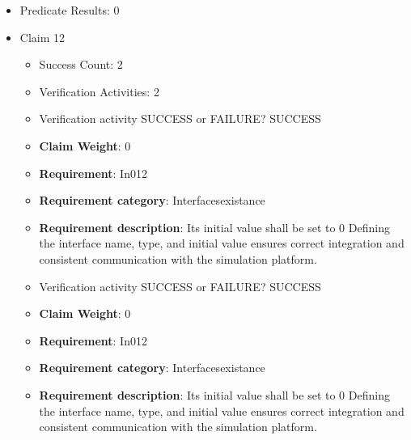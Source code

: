 \documentclass{article}
\begin{document}
\begin{itemize}
\begin{itemize}
					\item Verification activity SUCCESS or FAILURE? SUCCESS
					\item \textbf{Claim Weight}: 0
						\item \textbf{Requirement}: In011 
						\item \textbf{Requirement category}: Interfacesexistance 
						\item \textbf{Requirement description}: Its initial value shall be set to 0 Defining the interface name, type, and initial value ensures correct integration and consistent communication with the simulation platform.
					
				\end{itemize}
				
									    
				\item Predicate Results: 0

  				  \item Claim 12
				\begin{itemize}
			    	\item Success Count: 2 
			    	\item Verification Activities: 2
					\item Verification activity SUCCESS or FAILURE? SUCCESS
					\item \textbf{Claim Weight}: 0
						\item \textbf{Requirement}: In012 
						\item \textbf{Requirement category}: Interfacesexistance 
						\item \textbf{Requirement description}: Its initial value shall be set to 0 Defining the interface name, type, and initial value ensures correct integration and consistent communication with the simulation platform.
					
					\item Verification activity SUCCESS or FAILURE? SUCCESS
					\item \textbf{Claim Weight}: 0
						\item \textbf{Requirement}: In012 
						\item \textbf{Requirement category}: Interfacesexistance 
						\item \textbf{Requirement description}: Its initial value shall be set to 0 Defining the interface name, type, and initial value ensures correct integration and consistent communication with the simulation platform.
					
				\end{itemize}
				

\end{itemize}
\end{document}
